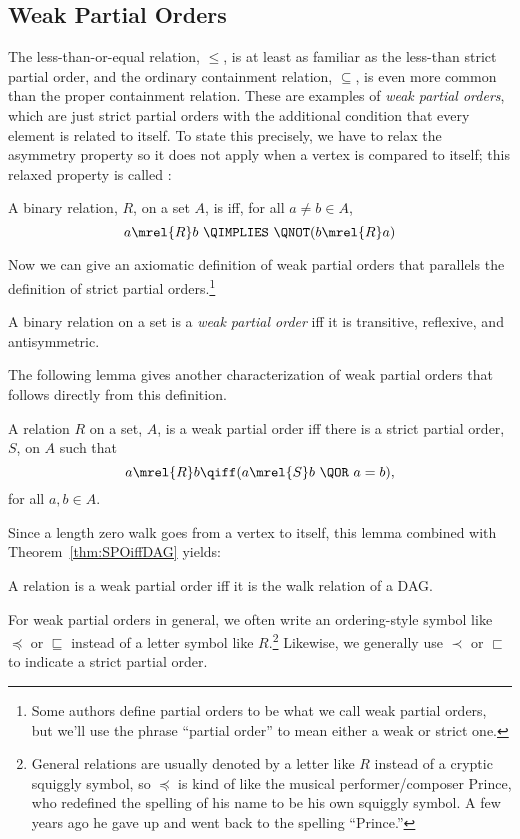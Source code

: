 \subsection{Weak Partial Orders}
The less-than-or-equal relation, $\leq$, is at least as familiar as
the less-than strict partial order, and the ordinary containment
relation, $\subseteq$, is even more common than the proper containment
relation.  These are examples of \emph{weak partial orders}, which are
just strict partial orders with the additional condition that every
element is related to itself.  To state this precisely, we have to
relax the asymmetry property so it does not apply when a vertex is
compared to itself; this relaxed property is called
:

\begin{definition}\label{antis}
A binary relation, $R$, on a set $A$, is  iff, for
all $a \neq b \in A$,
\[
a \mrel{R}  b\ \QIMPLIES\ \QNOT(b \mrel{R}  a)
\]

\end{definition}

Now we can give an axiomatic definition of weak partial orders that
parallels the definition of strict partial orders.\footnote{Some
  authors define partial orders to be what we call weak partial
  orders, but we'll use the phrase ``partial order'' to mean either a
  weak or strict one.}

\begin{definition}\label{def:weakPO-axiom}
A binary relation on a set is a \emph{weak partial order} iff it is
transitive, reflexive, and antisymmetric.
\end{definition}

The following lemma gives another characterization of weak partial
orders that follows directly from this definition.
\begin{lemma}
A relation $R$ on a set, $A$, is a weak partial order iff
there is a strict partial order, $S$, on $A$ such that
\[
a \mrel{R} b \qiff (a \mrel{S} b\ \QOR\ a = b),
\]
for all $a,b \in A$.
\end{lemma}

Since a length zero walk goes from a vertex to itself, this lemma
combined with Theorem~\ref{thm:SPOiffDAG} yields:
\begin{corollary}\label{weakPOiffDAGwalk}
A relation is a weak partial order iff it is the walk relation of a DAG.
\end{corollary}

For weak partial orders in general, we often write an ordering-style
symbol like $\preceq$ or $\sqsubseteq$ instead of a letter symbol like
$R$.\footnote{General relations are usually denoted by a letter like
  $R$ instead of a cryptic squiggly symbol, so $\preceq$ is kind of
  like the musical performer/composer Prince, who redefined the
  spelling of his name to be his own squiggly symbol.  A few years ago
  he gave up and went back to the spelling ``Prince.''}  Likewise, we
generally use $\prec$ or $\sqsubset$ to indicate a strict partial
order.

